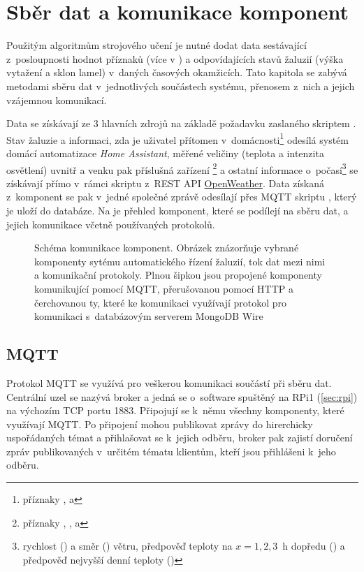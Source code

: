 \chapter{Sběr dat a komunikace komponent} \label{chap:dataCollection}
  Použitým algoritmům strojového učení je nutné dodat data sestávající z~posloupnosti hodnot příznaků (více v ) a odpovídajících stavů žaluzií (výška vytažení a sklon lamel) v~daných časových okamžicích. Tato kapitola se zabývá metodami sběru dat v~jednotlivých součástech systému, přenosem z~nich a jejich vzájemnou komunikací.
  
  Data se získávají ze 3 hlavních zdrojů na základě požadavku zaslaného skriptem . Stav žaluzie a informaci, zda je uživatel přítomen v~domácnosti\footnote{příznaky ,  a } odesílá systém domácí automatizace \emph{Home Assistant}, měřené veličiny (teplota a intenzita osvětlení) uvnitř a venku pak příslušná zařízení \footnote{příznaky , ,  a } a ostatní informace o~počasí\footnote{rychlost () a směr () větru, předpověď teploty na $x=1,2,3$~h dopředu () a předpověď nejvyšší denní teploty ()} se získávají přímo v~rámci skriptu  z~REST API \href{https://openweathermap.org/}{OpenWeather}. Data získaná z~komponent se pak v~jedné společné zprávě odesílají přes MQTT skriptu , který je uloží do databáze. Na  je přehled komponent, které se podílejí na sběru dat, a jejich komunikace včetně používaných protokolů.
  \begin{figure}
    \centering
    
    \caption[Schéma komunikace komponent]{Schéma komunikace komponent. Obrázek znázorňuje vybrané komponenty sytému automatického řízení žaluzií, tok dat mezi nimi a komunikační protokoly. Plnou šipkou jsou propojené komponenty komunikující pomocí MQTT, přerušovanou pomocí HTTP a čerchovanou ty, které ke komunikaci využívají protokol pro komunikaci s~databázovým serverem MongoDB Wire}
    \label{fig:comm}
  \end{figure}
  \section{MQTT} \label{sec:MQTT}
    Protokol MQTT se využívá pro veškerou komunikaci součástí při sběru dat. Centrální uzel se nazývá broker a jedná se o~software spuštěný na RPi1 (\cref{sec:rpi}) na výchozím TCP portu 1883. Připojují se k~němu všechny komponenty, které využívají MQTT. Po připojení mohou publikovat zprávy do hirerchicky uspořádaných témat a přihlašovat se k~jejich odběru, broker pak zajistí doručení zpráv publikovaných v~určitém tématu klientům, kteří jsou přihlášeni k~jeho odběru.
    
